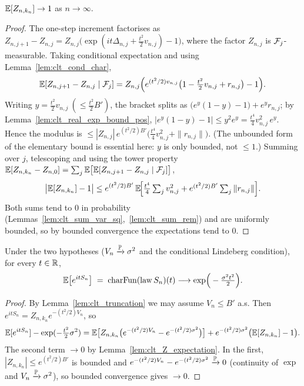 \begin{lemma}\label{lem:clt_Z_expectation}
\leanok
{}
$\mathbb{E}[Z_{n,k_n}]\to1$ as $n\to\infty$.
\end{lemma}

\begin{proof}\leanok
The one-step increment factorises as
$Z_{n,j+1}-Z_{n,j}=Z_{n,j}\big(\exp(it\Delta_{n,j}+\tfrac{t^2}{2}v_{n,j})-1\big)$,
where the factor $Z_{n,j}$ is $\mathcal{F}_j$-measurable. Taking conditional
expectation and using Lemma~\ref{lem:clt_cond_char},
\[
  \mathbb{E}[Z_{n,j+1}-Z_{n,j}\mid\mathcal{F}_j]
  = Z_{n,j}\Big(e^{(t^2/2)v_{n,j}}\big(1-\tfrac{t^2}{2}v_{n,j}+r_{n,j}\big)-1\Big).
\]
Writing $y=\tfrac{t^2}{2}v_{n,j}\ (\le\tfrac{t^2}{2}B')$, the bracket splits as
$\big(e^{y}(1-y)-1\big)+e^{y}r_{n,j}$; by
Lemma~\ref{lem:clt_real_exp_bound_pos}, $|e^{y}(1-y)-1|\le y^2 e^{y}
=\tfrac{t^4}{4}v_{n,j}^2\,e^{y}$. Hence the modulus is
$\le|Z_{n,j}|\,e^{(t^2/2)B'}\big(\tfrac{t^4}{4}v_{n,j}^2+\|r_{n,j}\|\big)$.
(The unbounded form of the elementary bound is essential here: $y$ is only bounded,
not $\le1$.) Summing over $j$, telescoping and using the tower property
$\mathbb{E}[Z_{n,k_n}-Z_{n,0}]=\sum_j\mathbb{E}\big[\mathbb{E}[Z_{n,j+1}-Z_{n,j}\mid\mathcal{F}_j]\big]$,
\[
  \big|\mathbb{E}[Z_{n,k_n}]-1\big|
  \le e^{(t^2/2)B'}\,\mathbb{E}\!\Big[\tfrac{t^4}{4}\textstyle\sum_j v_{n,j}^2
      + e^{(t^2/2)B'}\sum_j\|r_{n,j}\|\Big].
\]
Both sums tend to $0$ in probability
(Lemmas~\ref{lem:clt_sum_var_sq},~\ref{lem:clt_sum_rem}) and are uniformly
bounded, so by bounded convergence the expectations tend to $0$.
\end{proof}

\begin{lemma}\label{lem:clt_product}
\leanok
{}
Under the two hypotheses ($V_n\xrightarrow{\mathbb{P}}\sigma^2$ and the conditional
Lindeberg condition), for every $t\in\mathbb{R}$,
\[
  \mathbb{E}\big[e^{itS_n}\big]\;=\;\operatorname{charFun}(\mathrm{law}\,S_n)(t)
  \longrightarrow \exp\!\Big(-\tfrac{\sigma^2 t^2}{2}\Big).
\]
\end{lemma}

\begin{proof}\leanok
{}
By Lemma~\ref{lem:clt_truncation} we may assume $V_n\le B'$ a.s. Then
$e^{itS_n}=Z_{n,k_n}e^{-(t^2/2)V_n}$, so
\[
  \mathbb{E}[e^{itS_n}] - \exp(-\tfrac{t^2}{2}\sigma^2)
  = \mathbb{E}\big[Z_{n,k_n}\big(e^{-(t^2/2)V_n}-e^{-(t^2/2)\sigma^2}\big)\big]
    + e^{-(t^2/2)\sigma^2}\big(\mathbb{E}[Z_{n,k_n}]-1\big).
\]
The second term $\to0$ by Lemma~\ref{lem:clt_Z_expectation}. In the first,
$|Z_{n,k_n}|\le e^{(t^2/2)B'}$ is bounded and
$e^{-(t^2/2)V_n}-e^{-(t^2/2)\sigma^2}\xrightarrow{\mathbb{P}}0$ (continuity of $\exp$
and $V_n\xrightarrow{\mathbb{P}}\sigma^2$), so bounded convergence gives $\to0$.
\end{proof}

